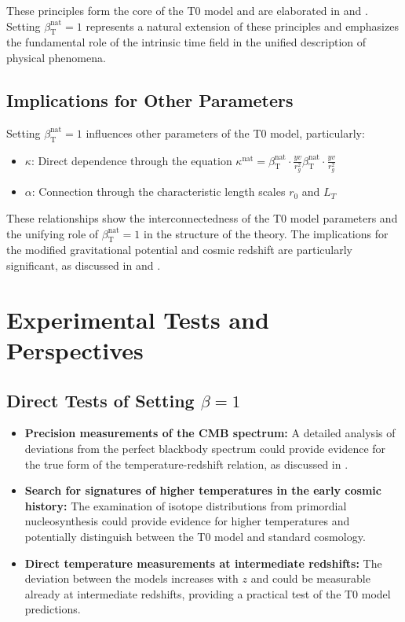 \documentclass[12pt,a4paper]{article}
\newcommand{\betaT}{\beta_{\text{T}}}
\begin{document}
	These principles form the core of the T0 model and are elaborated in \cite{pascher_zeit_2025} and \cite{pascher_lagrange_2025}. Setting \(\betaT^{\text{nat}} = 1\) represents a natural extension of these principles and emphasizes the fundamental role of the intrinsic time field in the unified description of physical phenomena.
	
	\subsection{Implications for Other Parameters}
	\label{subsec:implications_parameters}
	
	Setting \(\betaT^{\text{nat}} = 1\) influences other parameters of the T0 model, particularly:
	\begin{itemize}
		\item \(\kappa\): Direct dependence through the equation \(\kappa^{\text{nat}} = \betaT^{\text{nat}} \cdot \frac{yv}{r_g^2}\betaT^{\text{nat}} \cdot \frac{yv}{r_g^2}\)
		\item \(\alpha\): Connection through the characteristic length scales \(r_0\) and \(L_T\)
	\end{itemize}
	
	These relationships show the interconnectedness of the T0 model parameters and the unifying role of \(\betaT^{\text{nat}} = 1\) in the structure of the theory. The implications for the modified gravitational potential and cosmic redshift are particularly significant, as discussed in \cite{pascher_emergente_gravitation_2025} and \cite{pascher_galaxies_2025}.
	
	\section{Experimental Tests and Perspectives}
	\label{sec:experimental_tests}
	
	\subsection{Direct Tests of Setting \(\beta = 1\)}
	\label{subsec:direct_tests}
	
	\begin{itemize}
		\item \textbf{Precision measurements of the CMB spectrum:} A detailed analysis of deviations from the perfect blackbody spectrum could provide evidence for the true form of the temperature-redshift relation, as discussed in \cite{pascher_temp_2025}.
		\item \textbf{Search for signatures of higher temperatures in the early cosmic history:} The examination of isotope distributions from primordial nucleosynthesis could provide evidence for higher temperatures and potentially distinguish between the T0 model and standard cosmology.
		\item \textbf{Direct temperature measurements at intermediate redshifts:} The deviation between the models increases with \(z\) and could be measurable already at intermediate redshifts, providing a practical test of the T0 model predictions.
	\end{itemize}
	
\end{document}
